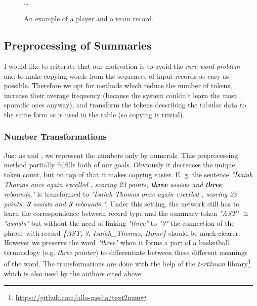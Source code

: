 \begin{figure}[!h]
    \centering
    \usetikzlibrary{shapes.multipart}
    \\ \dots
    \caption{An example of a player and a team record.} \label{rotowire_record_example}
\end{figure}

\subsection{Preprocessing of Summaries}

I would like to reiterate that our motivation is to avoid the \emph{rare word problem} and to make copying words from the sequences of input records as easy as possible. Therefore we opt for methods which reduce the number of tokens, increase their average frequency (because the system couldn't learn the most sporadic ones anyway), and transform the tokens describing the tabular data to the same form as is used in the table (so copying is trivial).

\subsubsection{Number Transformations} \label{num_trans_rw}

Just as \citep{wiseman2017} and \citep{puduppully2019datatotext}, we represent the numbers only by numerals. This preprocessing method partially fulfills both of our goals. Obviously it decreases the unique token count, but on top of that it makes copying easier. E. g. the sentence \emph{"Isaiah Thomas once again excelled , scoring 23 points, \textbf{three} assists and \textbf{three} rebounds."} is transformed to \emph{"Isaiah Thomas once again excelled , scoring 23 points, \textbf{3} assists and \textbf{3} rebounds."}. Under this setting, the network still has to learn the correspondence between record type and the summary token \emph{"AST"} $\cong$ \emph{"assists"} but without the need of linking \emph{"three"} to \emph{"3"} the connection of the phrase with record \emph{\{AST; 3; Isaiah\_Thomas; Home\}} should be much clearer. However we preserve the word \emph{"three"} when it forms a part of a basketball terminology (e.g. \emph{three pointer}) to differentiate between these different meanings of the word. The transformations are done with the help of the \emph{text2num} library\footnote{\url{https://github.com/allo-media/text2num}} which is also used by the authors cited above.

